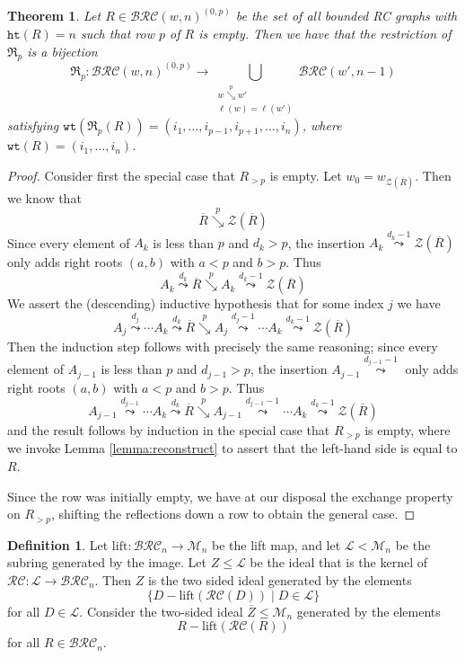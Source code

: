 \documentclass{amsart}
\newtheorem{theorem}{Theorem}[section]
\theoremstyle{definition}
\newtheorem{definition}[lemma]{Definition}
\theoremstyle{remark}
\numberwithin{equation}{subsection}
\newcommand{\downvar}[1]{\stackrel{#1}{\searrow}}
\newcommand{\wof}[1]{w_{#1}}
\newcommand{\wtt}{\mathtt{wt}}
\newcommand{\qr}{\mathfrak{R}}
\newcommand{\zeromap}{\mathcal{Z}}
\newcommand{\hr}{\mathtt{ht}}
\newcommand{\BRC}{\mathcal{BRC}}
\newcommand{\RC}{\mathcal{RC}}
\newcommand{\xleadsto}[2][]{\overset{#2}{\leadsto}}
\newcommand{\ins}[2]{{#2\xleadsto{#1}}}
\begin{document}
\begin{theorem}
Let $R\in\BRC(w,n)^{(0,p)}$ be the set of all bounded RC graphs with $\hr(R)=n$ such that row $p$ of $R$ is empty. Then we have that the restriction of $\qr_p$ is a bijection
$$\qr_p:\BRC(w,n)^{(0,p)}\to\bigcup_{\substack{w\downvar{p} w'\\\ell(w)=\ell(w')}} \BRC(w', n-1)$$
satisfying $\wtt(\qr_p(R)) = (i_1,\ldots,i_{p-1},i_{p+1},\ldots,i_{n})$, where $\wtt(R)=(i_1,\ldots,i_n)$.
\end{theorem}
\begin{proof}
Consider first the special case that $R_{>p}$ is empty. Let $w_0 = \wof{\zeromap(\overline{R})}$. Then we know that
$$\overline{R}\downvar{p} \zeromap(\overline{R})$$
Since every element of $A_k$ is less than $p$ and $d_k>p$, the insertion $\ins{d_k-1}{A_k}\zeromap(\overline{R})$ only adds right roots $(a,b)$ with $a<p$ and $b>p$. Thus
$$\ins{d_k}{A_k}\overline{R}\downvar{p} \ins{d_k-1}{A_k}\zeromap(\overline{R})$$
We assert the (descending) inductive hypothesis that for some index $j$ we have
$$\ins{d_j}{A_j}\cdots\ins{d_k}{A_k}\overline{R}\downvar{p} \ins{d_j-1}{A_j}\cdots\ins{d_k-1}{A_k}\zeromap(\overline{R})$$
Then the induction step follows with precisely the same reasoning; since every element of $A_{j-1}$ is less than $p$ and $d_{j-1}>p$, the insertion $\ins{d_{j-1}-1}{A_{j-1}}$ only adds right roots $(a,b)$ with $a<p$ and $b>p$. Thus
$$\ins{d_{j-1}}{A_{j-1}}\cdots\ins{d_k}{A_k}\overline{R}\downvar{p} \ins{d_{j-1}-1}{A_{j-1}}\cdots\ins{d_k-1}{A_k}\zeromap(\overline{R})$$
and the result follows by induction in the special case that $R_{>p}$ is empty, where we invoke Lemma \ref{lemma:reconstruct} to assert that the left-hand side is equal to $R$.

Since the row was initially empty, we have at our disposal the exchange property on $R_{>p}$, shifting the reflections down a row to obtain the general case.
\end{proof}

\begin{definition}
Let $\mathrm{lift}:\BRC_n\to\mathcal{M}_n$ be the lift map, and let $\mathcal{L}<\mathcal{M}_n$ be the subring generated by the image. Let $Z\leq \mathcal{L}$ be the ideal that is the kernel of $\RC:\mathcal{L}\to\BRC_n$. Then $Z$ is the two sided ideal generated by the elements
$$\{D - \mathrm{lift}(\RC(D))\mid D\in \mathcal{L}\}$$
for all $D\in\mathcal{L}$. Consider the two-sided ideal $\overline{Z}\leq \mathcal{M}_n$ generated by the elements
$$R - \mathrm{lift}(\RC(R))$$
for all $R\in\BRC_n$.
\end{definition}

\cite{samuelmolev}


\end{document}
